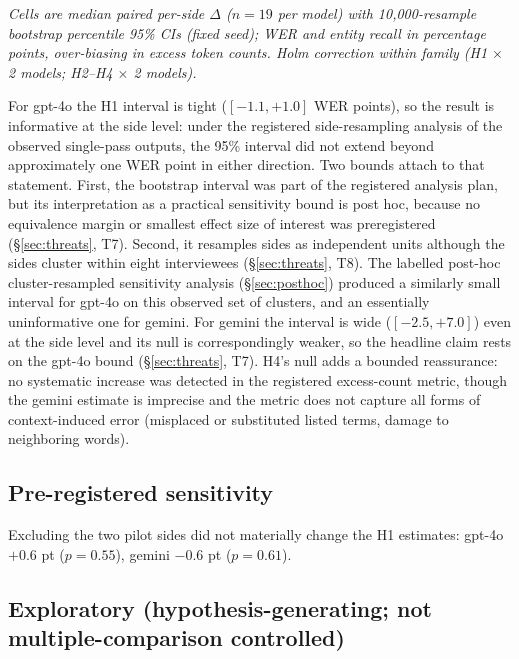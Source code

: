 \documentclass[11pt]{article}
\begin{document}
\noindent\footnotesize\emph{Cells are median paired per-side $\Delta$ ($n = 19$ per model) with 10{,}000-resample bootstrap percentile 95\% CIs (fixed seed); WER and entity recall in percentage points, over-biasing in excess token counts. Holm correction within family (H1 $\times$ 2 models; H2--H4 $\times$ 2 models).}\normalsize

For gpt-4o the H1 interval is tight ($[-1.1, +1.0]$ WER points), so the result is informative at the side level: under the registered side-resampling analysis of the observed single-pass outputs, the 95\% interval did not extend beyond approximately one WER point in either direction. Two bounds attach to that statement. First, the bootstrap interval was part of the registered analysis plan, but its interpretation as a practical sensitivity bound is post hoc, because no equivalence margin or smallest effect size of interest was preregistered (\S\ref{sec:threats}, T7). Second, it resamples sides as independent units although the sides cluster within eight interviewees (\S\ref{sec:threats}, T8). The labelled post-hoc cluster-resampled sensitivity analysis (\S\ref{sec:posthoc}) produced a similarly small interval for gpt-4o on this observed set of clusters, and an essentially uninformative one for gemini. For gemini the interval is wide ($[-2.5, +7.0]$) even at the side level and its null is correspondingly weaker, so the headline claim rests on the gpt-4o bound (\S\ref{sec:threats}, T7). H4's null adds a bounded reassurance: no systematic increase was detected in the registered excess-count metric, though the gemini estimate is imprecise and the metric does not capture all forms of context-induced error (misplaced or substituted listed terms, damage to neighboring words).

\subsection{Pre-registered sensitivity}
\label{sec:sensitivity}

Excluding the two pilot sides did not materially change the H1 estimates: gpt-4o $+0.6$ pt ($p = 0.55$), gemini $-0.6$ pt ($p = 0.61$).

\subsection{Exploratory (hypothesis-generating; not multiple-comparison controlled)}
\label{sec:exploratory}
\end{document}
